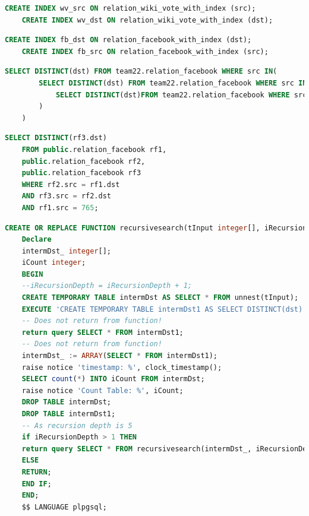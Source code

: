 \begin{lstlisting}[language=SQL,caption=Erstellen von Indexen auf relation Tabelle wikivote,frame=single, label={indexwikivote}]
    CREATE INDEX wv_src ON relation_wiki_vote_with_index (src);
    CREATE INDEX wv_dst ON relation_wiki_vote_with_index (dst);
\end{lstlisting}

\begin{lstlisting}[language=SQL,caption=Erstellen der Indexe für die relation Tabelle facebook,frame=single, label={indexfacebook}]
    CREATE INDEX fb_dst ON relation_facebook_with_index (dst);
    CREATE INDEX fb_src ON relation_facebook_with_index (src);
\end{lstlisting}

\begin{lstlisting}[language=SQL,caption = Verschachteltes SELECT Statement,frame=single,label={SELECT} ]
    SELECT DISTINCT(dst) FROM team22.relation_facebook WHERE src IN(
        SELECT DISTINCT(dst) FROM team22.relation_facebook WHERE src IN(
            SELECT DISTINCT(dst)FROM team22.relation_facebook WHERE src IN(1)
        )
    )
\end{lstlisting}

\begin{lstlisting}[language=SQL,caption = Rekursiver JOIN,frame=single, label={JOIN} ]
    SELECT DISTINCT(rf3.dst)
    FROM public.relation_facebook rf1,
    public.relation_facebook rf2,
    public.relation_facebook rf3
    WHERE rf2.src = rf1.dst
    AND rf3.src = rf2.dst
    AND rf1.src = 765;
\end{lstlisting}
\newpage
\begin{lstlisting}[language=SQL,caption = Selbstgeschriebenes Stored Procedure,frame=single, label={recursiveFunction} ]
    CREATE OR REPLACE FUNCTION recursivesearch(tInput integer[], iRecursionDepth integer, sTable text) RETURNS SETOF integer AS $$
    Declare
    intermDst_ integer[];
    iCount integer;
    BEGIN
    --iRecursionDepth = iRecursionDepth + 1;
    CREATE TEMPORARY TABLE intermDst AS SELECT * FROM unnest(tInput);
    EXECUTE 'CREATE TEMPORARY TABLE intermDst1 AS SELECT DISTINCT(dst) FROM ' || sTable || ' WHERE src IN (SELECT * FROM intermDst)';
    -- Does not return from function!
    return query SELECT * FROM intermDst1;
    -- Does not return from function!
    intermDst_ := ARRAY(SELECT * FROM intermDst1);
    raise notice 'timestamp: %', clock_timestamp();
    SELECT count(*) INTO iCount FROM intermDst;
    raise notice 'Count Table: %', iCount;
    DROP TABLE intermDst;
    DROP TABLE intermDst1;
    -- As recursion depth is 5
    if iRecursionDepth > 1 THEN
    return query SELECT * FROM recursivesearch(intermDst_, iRecursionDepth - 1, sTable);
    ELSE
    RETURN;
    END IF;
    END;
    $$ LANGUAGE plpgsql;
\end{lstlisting}


